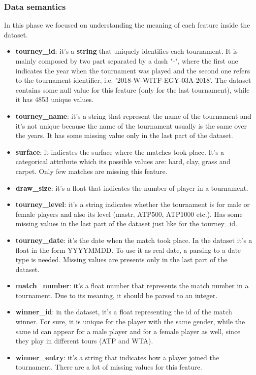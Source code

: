 \subsubsection{Data semantics}
In this phase we focused on understanding the meaning of each feature inside the dataset.
\begin{itemize}
    \item \textbf{tourney\_id}: it's a \textbf{string} that uniquely identifies each tournament. It is mainly composed by two part separated by a dash "-", where the first one indicates the year when the tournament was played and the second one refers to the tournament identifier, i.e. '2018-W-WITF-EGY-03A-2018'. The dataset contains some null value for this feature (only for the last tournament), while it has 4853 unique values.
    \item \textbf{tourney\_name}: it's a string that represent the name of the tournament and it's not unique because the name of the tournament usually is the same over the years. It has some missing value only in the last part of the dataset.
    \item \textbf{surface}: it indicates the surface where the matches took place. It's a categorical attribute which its possible values are: hard, clay, grass and carpet. Only few matches are missing this feature.
    \item \textbf{draw\_size}: it's a float that indicates the number of player in a tournament.
    \item \textbf{tourney\_level}: it's a string indicates whether the tournament is for male or female players and also its level (mastr, ATP500, ATP1000 etc.). Has some missing values in the last part of the dataset just like for the tourney\_id.
    \item \textbf{tourney\_date}: it's the date when the match took place. In the dataset it's a float in the form YYYYMMDD. To use it as real date, a parsing to a date type is needed. Missing values are presents only in the last part of the dataset.
    \item \textbf{match\_number}: it's a float number that represents the match number in a tournament. Due to its meaning, it should be parsed to an integer.
    \item \textbf{winner\_id}: in the dataset, it's a float representing the id of the match winner. For sure, it is unique for the player with the same gender, while the same id can appear for a male player and for a female player as well, since they play in different tours (ATP and WTA).
    \item \textbf{winner\_entry}: it's a string that indicates how a player joined the tournament. There are a lot of missing values for this feature.

\end{itemize}
